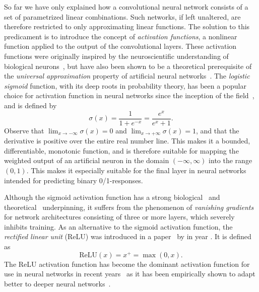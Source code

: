 So far we have only explained how a convolutional neural network consists of a set of parametrized linear combinations.
Such networks, if left unaltered, are therefore restricted to only approximating linear functions.
The solution to this predicament is to introduce the concept of \textit{activation functions}, a nonlinear function applied to the output of the convolutional layers.
These activation functions were originally inspired by the neuroscientific understanding of biological neurons~\cite[p.~165]{goodfellow}, but have also been shown to be a theoretical prerequisite of the \textit{universal approximation} property of artificial neural networks~\cite{uat-sigmoid,uat-nonpolynomial}.
The \textit{logistic sigmoid} function, with its deep roots in probability theory, has been a popular choice for activation function in neural networks since the inception of the field~\cite{rosenblatt-perceptron-1958}, and is defined by
%
\begin{equation*}
  \sigma(x) = \frac{1}{1 + e^{-x}} = \frac{e^x}{e^x + 1}.
  \tag{Sigmoid activation function}
\end{equation*}
%
Observe that $\lim_{x \to -\infty} \sigma(x) = 0$ and $\lim_{x \to +\infty} \sigma(x) = 1$, and that the derivative is positive over the entire real number line. This makes it a bounded, differentiable, monotonic function, and is therefore suitable for mapping the weighted output of an artificial neuron in the domain $(-\infty, \infty)$ into the range $(0, 1)$.
This makes it especially suitable for the final layer in neural networks intended for predicting binary 0/1-responses.

Although the sigmoid activation function has a strong biological~\cite{rosenblatt-perceptron-1958} and theoretical~\cite{uat-sigmoid} underpinning, it suffers from the phenomenon of \textit{vanishing gradients} for network architectures consisting of three or more layers, which severely inhibits training.
As an alternative to the sigmoid activation function, the \textit{rectified linear unit} (ReLU) was introduced in a paper~\cite{relu-original-paper} by \citeauthor{relu-original-paper} in year \citeyear{relu-original-paper}.
It is defined as
%
\begin{equation*}
  \mathrm{ReLU}(x) = x^+ = \max(0, x).
  \tag{ReLU activation function}
\end{equation*}
%
The ReLU activation function has become the dominant activation function for use in neural networks in recent years~\cite[p.~438]{relu-popularity} as it has been empirically shown to adapt better to deeper neural networks~\cite{relu-better-than-sigmoid}.
